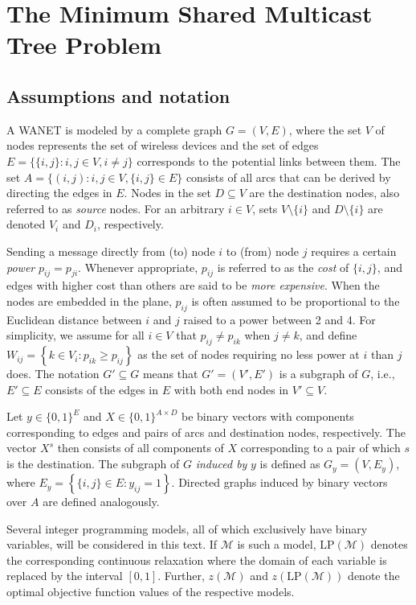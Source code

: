 \section{The Minimum Shared Multicast Tree Problem}
\label{sec:SBT}

\subsection{Assumptions and notation} \label{sec:notation}

A WANET is modeled by a complete graph $G=(V,E)$, where the set $V$ of nodes represents the set of wireless devices and the set of edges $E=\{\{i,j\}:i,j\in V, i\neq j\}$ corresponds to the potential links between them.
The set $A=\{(i,j):i,j\in V,\{i,j\}\in E\}$ consists of all arcs that can be derived by directing the edges in $E$.
Nodes in the set $D\subseteq V$ are the destination nodes, also referred to as \emph{source} nodes.
For an arbitrary $i\in V$, sets $V\setminus \{i\}$ and $D\setminus\{i\}$ are denoted $V_i$ and $D_i$, respectively.

Sending a message directly from (to) node $i$ to (from) node $j$ requires a certain \emph{power} $p_{ij}=p_{ji}$.
Whenever appropriate, $p_{ij}$ is referred to as the \emph{cost} of $\{i,j\}$,
and edges with higher cost than others are said to be \emph{more expensive}.
When the nodes are embedded in the plane, $p_{ij}$ is often assumed \citep{Papadimitriou06SBT,Haugland12Dual} to be
proportional to the Euclidean distance between $i$ and $j$ raised to a power between 2 and 4.
For simplicity, we assume for all $i\in V$ that $p_{ij}\neq p_{ik}$ when $j\neq k$, and define
$W_{ij}=\left\{k\in V_i: p_{ik}\geq p_{ij}\right\}$
as the set of nodes requiring no less power at $i$ than $j$ does.
The notation $G'\subseteq G$ means that $G'=(V',E')$ is a subgraph of $G$, i.e., $E'\subseteq E$ consists of the edges in $E$ with both end nodes in $V'\subseteq V$.

Let $y \in \{0,1\}^E$ and $X\in\{0,1\}^{A\times D}$ be binary vectors with components corresponding to
edges and pairs of arcs and destination nodes, respectively.
The vector $X^s$ then consists of all components of $X$ corresponding to a pair of which $s$ is the destination.
The subgraph of $G$ \emph{induced by} $y$ is defined as $G_y=(V,E_y)$, where $E_y=\left\{\{i,j\}\in E: y_{ij}=1\right\}$.
Directed graphs induced by binary vectors over $A$ are defined analogously.

Several integer programming models, all of which exclusively have binary variables, will be considered in this text.
If $\mathcal{M}$ is such a model, $\text{LP}(\mathcal{M})$ denotes the corresponding continuous relaxation
where the domain of each variable is replaced by the interval $[0,1]$.
Further, $z\left(\mathcal{M}\right)$ and $z\left(\text{LP}(\mathcal{M})\right)$ denote the optimal objective function values of the respective models.


